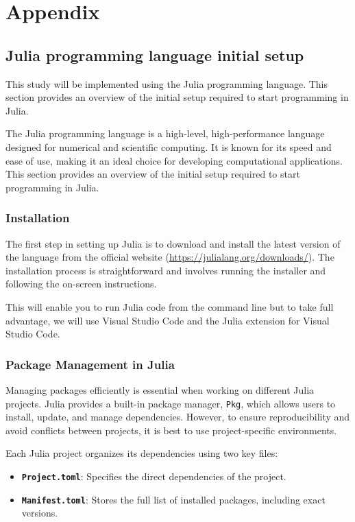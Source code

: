 \chapter{Appendix}
\label{ch::Appendix}

\setcounter{chapter}{1}

\section{Julia programming language initial setup}
\label{sec::JuliaSetup}

This study will be implemented using the Julia programming language.
This section provides an overview of the initial setup required to start programming in Julia.

The Julia programming language is a high-level, high-performance language designed for
numerical and scientific computing. It is known for its speed and ease of use, making
it an ideal choice for developing computational applications. This section provides an
overview of the initial setup required to start programming in Julia.

\subsection{Installation}

The first step in setting up Julia is to download and install the latest version of the language
from the official website (\url{https://julialang.org/downloads/}). The installation process is
straightforward and involves running the installer and following the on-screen instructions.

This will enable you to run Julia code from the command line but to take full advantage, we will use
Visual Studio Code and the Julia extension for Visual Studio Code.

\subsection{Package Management in Julia}

Managing packages efficiently is essential when working on different Julia projects. Julia provides a built-in package manager, \texttt{Pkg}, which allows users to install, update, and manage dependencies. However, to ensure reproducibility and avoid conflicts between projects, it is best to use project-specific environments.

Each Julia project organizes its dependencies using two key files:
\begin{itemize}
    \item \textbf{\texttt{Project.toml}}: Specifies the direct dependencies of the project.
    \item \textbf{\texttt{Manifest.toml}}: Stores the full list of installed packages, including exact versions.
\end{itemize}

